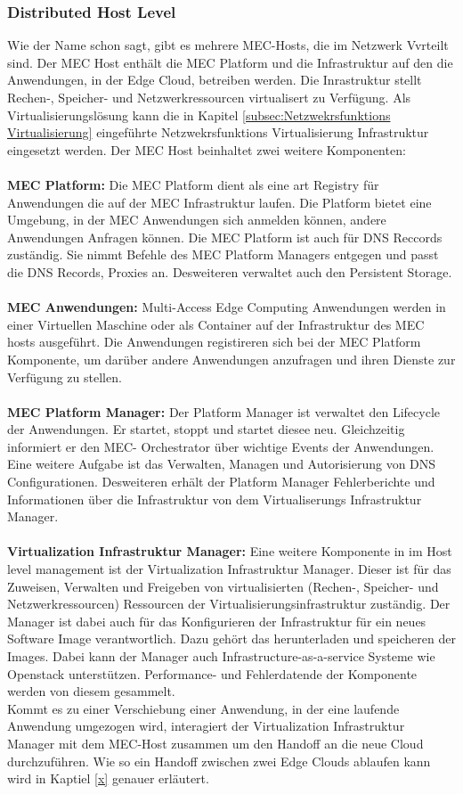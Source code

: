 \documentclass[runningheads]{llncs}
\numberwithin{figure}{section}
\begin{document}
\subsubsection{Distributed Host Level}
Wie der Name schon sagt, gibt es mehrere MEC-Hosts, die im Netzwerk Vvrteilt sind.
Der MEC Host enthält die MEC Platform und die Infrastruktur auf den die Anwendungen, in der Edge Cloud, betreiben werden.
Die Inrastruktur stellt Rechen-, Speicher- und Netzwerkressourcen virtualisert zu Verfügung. Als Virtualisierungslösung kann
die in Kapitel \ref{subsec:Netzwekrsfunktions Virtualisierung} eingeführte Netzwekrsfunktions Virtualisierung Infrastruktur
eingesetzt werden. Der MEC Host beinhaltet zwei weitere Komponenten:
\\
\\
\textbf{MEC Platform:} Die MEC Platform dient als eine art Registry für  
Anwendungen die auf der MEC Infrastruktur laufen. Die Platform bietet eine Umgebung, in der MEC Anwendungen sich anmelden können,
andere Anwendungen Anfragen können. Die MEC Platform ist auch für DNS Reccords zuständig. Sie nimmt Befehle
des MEC Platform Managers entgegen und passt die DNS Records, Proxies an. Desweiteren verwaltet auch den Persistent Storage.
\\
\\
\textbf{MEC Anwendungen:} Multi-Access Edge Computing Anwendungen werden in einer Virtuellen Maschine oder als
Container auf der Infrastruktur des MEC hosts ausgeführt. Die Anwendungen registireren sich bei der MEC Platform
Komponente, um darüber andere Anwendungen anzufragen und ihren Dienste zur Verfügung zu stellen.
\\
\\
\textbf{MEC Platform Manager:} Der Platform Manager ist verwaltet den Lifecycle der Anwendungen. Er startet, stoppt und startet diesee neu.
Gleichzeitig informiert er den MEC- Orchestrator über wichtige Events der Anwendungen. 
Eine weitere Aufgabe ist das Verwalten, Managen und Autorisierung von DNS Configurationen.
Desweiteren erhält der Platform Manager Fehlerberichte und Informationen über die Infrastruktur von dem Virtualiserungs Infrastruktur Manager.
\\
\\ 
\textbf{Virtualization Infrastruktur Manager:} Eine weitere Komponente in im Host level management ist der Virtualization Infrastruktur
Manager. Dieser ist für das Zuweisen, Verwalten und Freigeben von virtualisierten (Rechen-, Speicher- und Netzwerkressourcen)
Ressourcen der Virtualisierungsinfrastruktur zuständig. Der Manager ist dabei auch für das Konfigurieren der Infrastruktur für 
ein neues Software Image verantwortlich. Dazu gehört das herunterladen und speicheren der Images. Dabei kann der Manager auch 
Infrastructure-as-a-service Systeme wie Openstack unterstützen. Performance- und Fehlerdatende der Komponente werden von diesem gesammelt.
\\
Kommt es zu einer Verschiebung einer Anwendung, in der eine laufende Anwendung umgezogen wird,
interagiert der Virtualization Infrastruktur Manager mit dem MEC-Host zusammen um den Handoff an die neue Cloud durchzuführen.
Wie so ein Handoff zwischen zwei Edge Clouds ablaufen kann wird in Kaptiel \ref{x} genauer erläutert.
\end{document}
